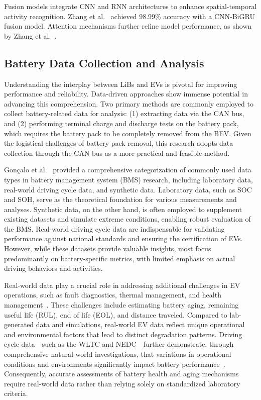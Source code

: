 Fusion models integrate \gls{CNN} and \gls{RNN} architectures to enhance spatial-temporal activity recognition. 
Zhang et al.~\cite{Zhang2023} achieved 98.99\% accuracy with a \gls{CNN}-\gls{BiGRU} fusion model. Attention mechanisms further refine model performance, as shown by Zhang et al.~\cite{Zhang2019attention}.


\subsection{Battery Data Collection and Analysis}

Understanding the interplay between \glspl{LiB} and \glspl{EV} is pivotal for improving performance and reliability. 
Data-driven approaches show immense potential in advancing this comprehension. 
Two primary methods are commonly employed to collect battery-related data for analysis: 
(1) extracting data via the \gls{CAN} bus, and (2) performing terminal charge and discharge tests on the battery pack, 
which requires the battery pack to be completely removed from the \gls{BEV}. 
Given the logistical challenges of battery pack removal, this research adopts data collection through the \gls{CAN} bus as a more practical and feasible method.

Gonçalo et al.~\cite{dosreisG2021} provided a comprehensive categorization of commonly used data types in battery management system (\gls{BMS}) research, 
including laboratory data, real-world driving cycle data, and synthetic data. 
Laboratory data, such as \gls{SOC} and \gls{SOH}, serve as the theoretical foundation for various measurements and analyses. 
Synthetic data, on the other hand, is often employed to supplement existing datasets and simulate extreme conditions, enabling robust evaluation of the \gls{BMS}. 
Real-world driving cycle data are indispensable for validating performance against national standards and ensuring the certification of \glspl{EV}. 
However, while these datasets provide valuable insights, most focus predominantly on battery-specific metrics, with limited emphasis on actual driving behaviors and activities.

Real-world data play a crucial role in addressing additional challenges in \gls{EV} operations, such as fault diagnostics, thermal management, and health management~\cite{waldmann2014temperature}. 
These challenges include estimating battery aging, remaining useful life (\gls{RUL}), end of life (\gls{EOL}), and distance traveled. 
Compared to lab-generated data and simulations, real-world \gls{EV} data reflect unique operational and environmental factors that lead to distinct degradation patterns. 
Driving cycle data—such as the \gls{WLTC} and \gls{NEDC}—further demonstrate, 
through comprehensive natural-world investigations, that variations in operational conditions and environments significantly impact battery performance~\cite{safdari2022numerical, 9424412}. 
Consequently, accurate assessments of battery health and aging mechanisms require real-world data rather than relying solely on standardized laboratory criteria.

